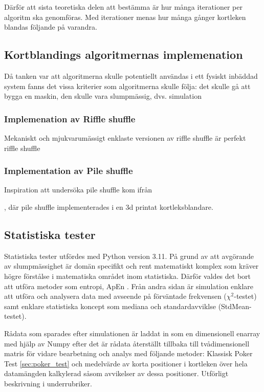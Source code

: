 \documentclass[swedish,a4paper]{article}
\begin{document}
Därför att sista teoretiska delen att bestämma
är hur många iterationer per algoritm ska genomföras. Med iterationer menas
hur många gånger kortleken blandas följande på varandra.

\subsection{Kortblandings algoritmernas implemenation}

Då tanken var att  algoritmerna skulle potentiellt användas i ett fysiskt
inbäddad system fanns det vissa  kriterier som algoritmerna skulle följa: det
skulle gå att bygga en maskin, den skulle vara slumpmässig, dvs. simulation

\subsubsection{Implemenation av Riffle shuffle}
Mekaniskt och mjukvarumässigt enklaste versionen av riffle shuffle är perfekt riffle shuffle

\subsubsection{Implementation av Pile shuffle}
Inspiration att undersöka pile shuffle kom ifrån

\textcite{3DprintedLife2021},
där pile shuffle implementerades i en 3d printat kortleksblandare.  


\subsection{Statistiska tester}
Statistiska tester utfördes med Python version 3.11. På 
grund av att avgörande av slumpmässighet är domän
specifikt och rent matematiskt komplex som kräver högre förstålse i
matematiska området inom statistiska. Därför valdes det bort att utföra
metoder som entropi, ApEn \parencite{ApEn}. Från andra sidan är
simulation enklare att utföra och analysera data med avseende på
förväntade frekvensen ($\chi^2$-testet) samt enklare statistiska koncept
som mediana och standardavviklse (StdMean-testet).    


Rådata som sparades efter simulationen är laddat in som en dimensionell
\gls{enarray} med hjälp av Numpy  efter det är rådata återställt tillbaka till
tvådimensionell matris för vidare bearbetning och analys med följande
metoder: Klassisk Poker Test \ref{sec:poker_test} och medelvärde av
korta positioner i kortleken över hela datamängden kalkylerad såsom
avvikelser av dessa positioner. Utförligt beskrivning i underrubriker. 
\end{document}
